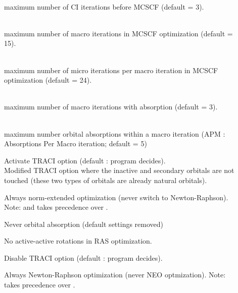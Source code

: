 \begin{description}
\item[]
   \\
  maximum number of CI iterations before MCSCF (default = 3).
 
\item[]
   \\
  maximum number of macro iterations in MCSCF optimization (default = 15).
 
\item[]
   \\
  maximum number of micro iterations per macro iteration in MCSCF optimization
  (default = 24).
 
\item[]
   \\
  maximum number of macro iterations with absorption (default = 3). 
 
\item[]
   \\
  maximum number orbital absorptions within
  a macro iteration 
  (APM : Absorptions Per Macro iteration; default = 5)
 
\item[]
  Activate TRACI option (default : program decides).\\
  Modified TRACI option where the inactive and secondary orbitals are not
  touched (these two types of orbitals are already natural orbitals).
 
\item[]
  Always norm-extended optimization (never switch to New\-ton-Raph\-son).
  Note:  and 
  takes precedence over .
 
\item[]
  Never orbital absorption (default settings removed)
 
\item[]
  No active-active rotations in RAS optimization.
 
\item[]
  Disable TRACI option (default : program decides).

\item[]
  Always Newton-Raphson optimization (never NEO optmization).
  Note:  takes precedence over
  . 
 

\end{description}
